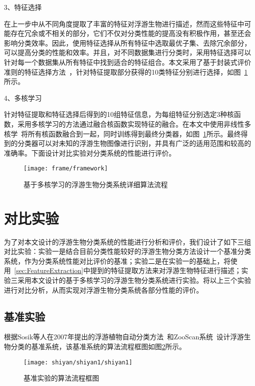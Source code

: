 3、特征选择

 在上一步中从不同角度提取了丰富的特征对浮游生物进行描述，然而这些特征中可能存在冗余或不相关的部分，它们不仅对分类性能的提高没有积极作用，甚至还会影响分类效率。因此，使用特征选择从所有特征中选取最优子集、去除冗余部分，可以提高分类的性能和效率。并且，对不同数据集进行分类时，采用特征选择可以针对每一个数据集从所有特征中找到适合的特征组合。本文采用了基于封装式评价准则的特征选择方法~\cite{Kohavi1997Wrappers}，针对特征提取部分获得的10类特征分别进行选择，如图~\ref{fig:framework}所示。

4、多核学习

针对特征提取和特征选择后得到的10组特征信息，为每组特征分别选定3种核函数，采用多核学习的方法通过融合核函数实现特征的融合。在本文中使用非线性多核学~\cite{cortes2009learning}将所有核函数融合到一起，同时训练得到最终分类器，如图~\ref{fig:framework}所示。最终得到的分类器可以对未知的浮游生物图像进行识别，并具有广泛的适用范围和较高的准确率。下面设计对比实验对分类系统的性能进行评价。

\begin{figure}[H] %
  \centering
  \texttt{[image: frame/framework]}
  \caption{基于多核学习的浮游生物分类系统详细算法流程}
  \label{fig:framework}
\end{figure}

\section{对比实验}
\label{sec:experiment}

为了对本文设计的浮游生物分类系统的性能进行分析和评价，我们设计了如下三组对比实验：实验一是结合目前分类性能较好的浮游生物分类方法设计一个基准分类系统，作为分类系统性能对比评价的基准；实验二是在实验一的基础上，将使用~\ref{sec:FeatureExtraction}中提到的特征提取方法来对浮游生物特征进行描述；实验三采用本文设计的基于多核学习的浮游生物分类系统进行实验。将以上三个实验进行对比分析，从而实现对浮游生物分类系统各部分性能的评价。

\subsection{基准实验}
\label{sec:baselineExperiment}

根据Sosik等人在2007年提出的浮游植物自动分类方法~\cite{sosik2007automated}和ZooScan系统~\cite{gorsky2010digital}设计浮游生物分类的基准系统，该基准系统的算法流程框图如图\ref{fig:shiyan1frame}所示。
\begin{figure}[H] %
  \centering
  \texttt{[image: shiyan/shiyan1/shiyan1]}
  \caption{基准实验的算法流程框图}
  \label{fig:shiyan1frame}
\end{figure}

